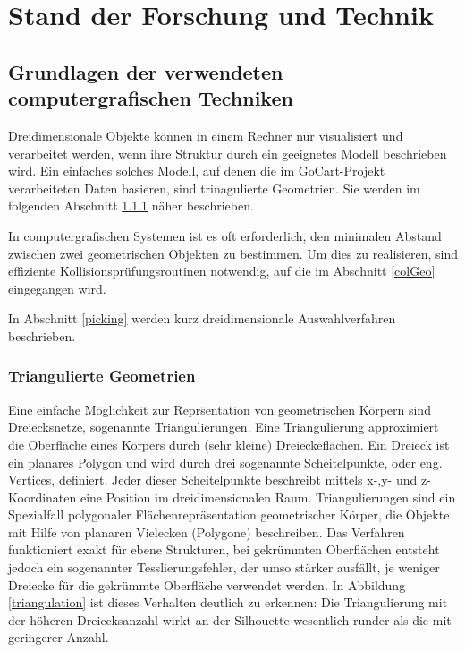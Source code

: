 \chapter{Stand der Forschung und Technik}
\label{cha:psoDomes}
	

\section{Grundlagen der verwendeten computergrafischen Techniken}

Dreidimensionale Objekte k\"onnen in einem Rechner nur visualisiert und verarbeitet werden, wenn ihre Struktur durch ein geeignetes Modell beschrieben wird. Ein einfaches solches Modell, auf denen die im GoCart-Projekt verarbeiteten Daten basieren, sind trinagulierte Geometrien. Sie werden im folgenden Abschnitt \ref{triGeo} n\"aher beschrieben.

In computergrafischen Systemen ist es oft erforderlich, den minimalen Abstand zwischen zwei geometrischen Objekten zu bestimmen. Um dies zu realisieren, sind effiziente Kollisionspr\"ufungsroutinen notwendig, auf die im Abschnitt \ref{colGeo} eingegangen wird.
 
In Abschnitt \ref{picking} werden kurz dreidimensionale Auswahlverfahren beschrieben.
 
\subsection{Triangulierte Geometrien}
\label{triGeo}

Eine einfache M\"oglichkeit zur Repr\"sentation von geometrischen K\"orpern sind Dreiecksnetze, sogenannte Triangulierungen. Eine Triangulierung approximiert die Oberfl\"ache eines K\"orpers durch (sehr kleine) Dreieckefl\"achen. Ein Dreieck ist ein planares Polygon und wird durch drei sogenannte Scheitelpunkte, oder eng. Vertices, definiert. Jeder dieser Scheitelpunkte beschreibt mittels x-,y- und z-Koordinaten eine Position im dreidimensionalen Raum. Triangulierungen sind ein Spezialfall polygonaler Flächenrepräsentation geometrischer K\"orper, die Objekte mit Hilfe von planaren Vielecken (Polygone) beschreiben. Das Verfahren funktioniert exakt f\"ur ebene Strukturen, bei gekrümmten Oberfl\"achen entsteht jedoch ein sogenannter Tesslierungsfehler, der umso stärker ausf\"allt, je weniger Dreiecke für die gekr\"ummte Oberfl\"ache verwendet werden. In Abbildung \ref{triangulation} ist dieses Verhalten deutlich zu erkennen: Die Triangulierung mit der h\"oheren Dreiecksanzahl wirkt an der Silhouette wesentlich runder als die mit geringerer Anzahl. 


